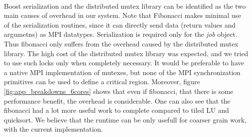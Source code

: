 \paragraph{}
Boost serialization and the distributed mutex library can be identified as the two main causes of overhead in our system.    
Note that Fibonacci makes minimal use of the serialization routines, since it can directly send data (return values and 
argumetns) as MPI datatypes.  Serialization is required only for the \emph{job} object.  Thus fibonacci only suffers from
the overhead caused by the distributed mutex library.  The high cost of the distributed mutex library was expected, and we
tried to use such locks only when completely necessary.  It would be preferable to have a native MPI implementation of 
mutexes, but none of the MPI synchronization primitives can be used to define a critical region.  Moreover, figure 
\ref{fig:app_breakdowns_6cores} shows that even if fibonacci, that there is some performance benefit, the overhead is
considerable.  One can also see that the fibonacci had a lot more useful work to complete compared to tiled LU and 
quicksort.  We believe that the runtime can be only usefull for coarser grain work, with the current implementation.

\paragraph{}

